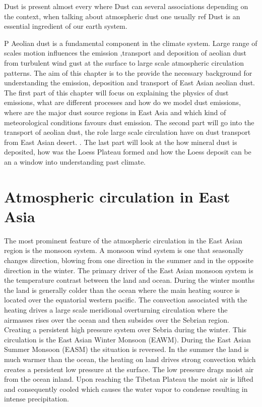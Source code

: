 Dust is present almost every where 
Dust can several associations depending on the context,  when talking about atmospheric dust one usually ref   Dust is an essential ingredient of our earth system.   

P Aeolian dust is a fundamental component in the climate system. Large range of scales motion influences the emission 
,transport and deposition of aeolian dust from turbulent wind gust at the surface to large scale atmospheric circulation 
patterns. The aim of this chapter is to the provide the necessary background for understanding the emission, deposition 
and transport of East Asian aeolian dust. The first part of this chapter will focus on explaining the physics of dust 
emissions, what are different processes and how do we model dust emissions, where are the major dust source regions in 
East Asia and which kind of meteorological conditions favours dust emission. The second part will go into the transport 
of aeolian dust, the role large scale circulation have on dust transport from East Asian desert. . The last part will look at the how mineral dust is deposited, how was the 
Loess Plateau formed and how the Loess deposit can be an a window into understanding past climate.

\section{Atmospheric circulation in East Asia}
The most prominent feature of the atmospheric circulation in the East Asian region is the monsoon system. A monsoon wind system is one that seasonally changes direction, blowing from one direction in the summer and in the opposite direction in the winter.  The primary driver of the East Asian monsoon system is the temperature contrast between the land and ocean. During the winter months the land is generally colder than the ocean where the main heating source is located over the equatorial western pacific. The convection associated with the heating drives a large scale meridional overturning circulation where the airmasses rises over the ocean and then subsides over the Sebrian region. Creating a persistent high pressure system over Sebria during the winter. This circulation is the East Asian Winter Monsoon (EAWM). During the East Asian Summer Monsoon (EASM) the situation is reversed. In the summer the land is much warmer than the ocean, the heating on land drives strong convection which creates a persistent low pressure at the surface. The low pressure drags moist air from the ocean inland. Upon reaching the Tibetan Plateau the moist air is lifted and consequently cooled which causes the water vapor to condense resulting in intense precipitation. 

